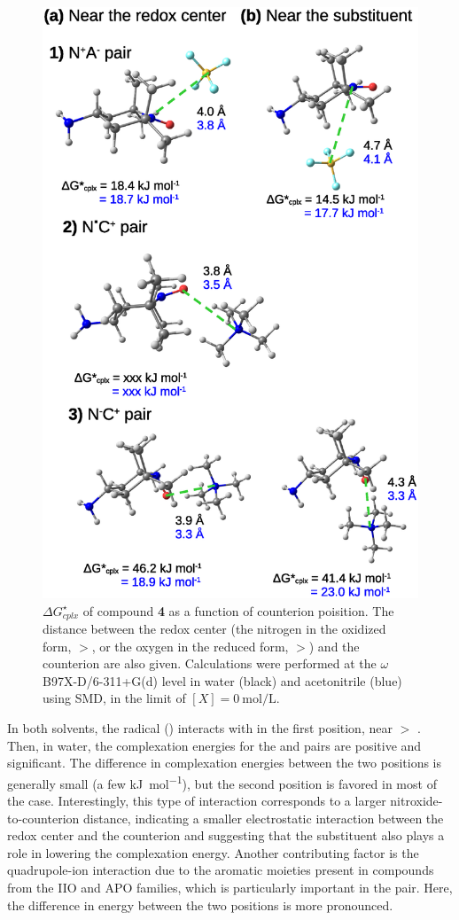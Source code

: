 \documentclass[review,preprint]{elsarticle}
\begin{document}
\begin{figure}[!h]
\centering
\includegraphics[width=.8\linewidth]{Figure12}
\caption{$\Delta G^\star_{cplx}$ of compound \textbf{4} as a function of counterion poisition. The distance between the redox center (the nitrogen in the oxidized form, $>$, or the oxygen in the reduced form, $>$) and the counterion are also given. Calculations were performed at the $\omega$B97X-D/6-311+G(d) level in water (black) and acetonitrile (blue) using SMD, in the limit of $[X]=\SI{0}{\mole\per\liter}$.}
\label{fig:pos-anion}
\end{figure}

In both solvents, the radical () interacts with  in the first position, near  $>$ \cite{zhangEffectHeteroatomFunctionality2018}. Then, in water, the complexation energies for the  and  pairs are positive and significant. The difference in complexation energies between the two positions is generally small (a few \si{\kilo\joule\per\mole}), but the second position is favored in most of the case. Interestingly, this type of interaction corresponds to a larger nitroxide-to-counterion distance, indicating a smaller electrostatic interaction between the redox center and the counterion and suggesting that the substituent also plays a role in lowering the complexation energy. Another contributing factor is the quadrupole-ion interaction due to the aromatic moieties present in compounds from the IIO and APO families, which is particularly important in the  pair. Here, the difference in energy between the two positions is more pronounced.
\end{document}
